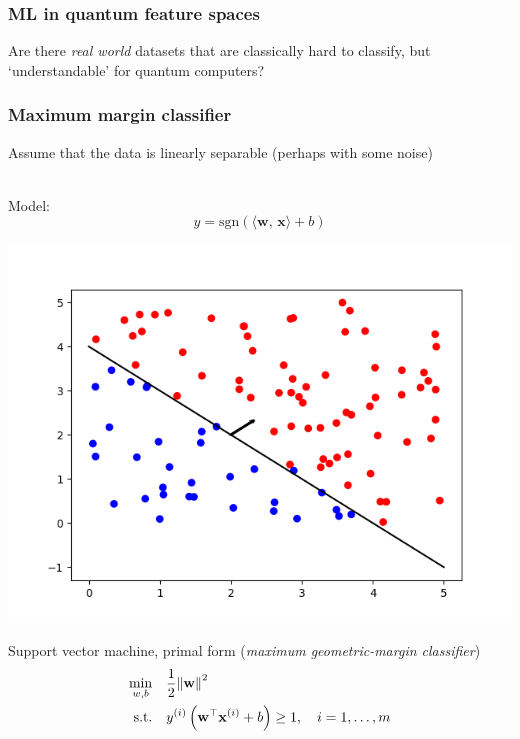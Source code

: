 \documentclass{beamer}
\begin{document}
\begin{frame}
    \frametitle{ML in quantum feature spaces}

    \centering
    \color{red} Are there \emph{real world} datasets that are classically hard to classify, but `understandable' for quantum computers?

\end{frame}

\begin{frame}
    \frametitle{Maximum margin classifier}
    \begin{minipage}{.45\textwidth}
        Assume that the data is linearly separable (perhaps with some noise)

        \ \\
        Model:
            \[y=\text{sgn}\left( \langle \mathbf{w},\, \mathbf{x}\rangle + b \right)\]
        
    \end{minipage}
    \begin{minipage}{.45\textwidth}
        \includegraphics[width=\textwidth]{pics/lin-sep.png}
    \end{minipage}
    
    \begin{block}{Support vector machine, primal form (\emph{maximum geometric-margin classifier})}
        \begin{align*}
            \min_{w,b} & \quad \frac{1}{2}\norm{\mathbf{w}}^2 \\
            \mathrm{s.t.} & \quad y^{(i)}\left( \mathbf{w}^\top \mathbf{x}^{(i)} + b \right) \geq 1, \quad i=1,\dots, m
        \end{align*}

    \end{block}

    \end{frame}
\end{document}
